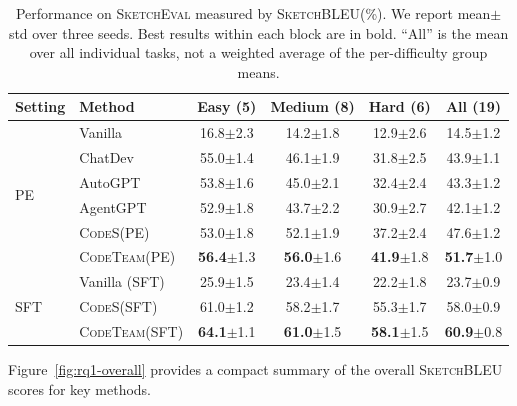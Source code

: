 \documentclass[format=acmsmall, review=false, screen=true]{acmart}
\newcommand{\tool}{\textsc{CodeTeam}\xspace}
\newcommand{\codes}{\textsc{CodeS}\xspace}
\newcommand{\sketcheval}{\textsc{SketchEval}\xspace}
\newcommand{\sketchbleu}{\textsc{SketchBLEU}\xspace}
\begin{document}
\begin{table}[t]
\centering
\small
\caption{Performance on \sketcheval measured by \sketchbleu (\%). We report mean$\pm$std over three seeds. Best results within each block are in bold. ``All'' is the mean over all individual tasks, not a weighted average of the per-difficulty group means.}
\label{tab:rq1-main}
\begin{tabular}{@{}llcccc@{}}
\toprule
Setting & Method & Easy (5) & Medium (8) & Hard (6) & All (19) \\
\midrule
\multirow{6}{*}{PE}
  & Vanilla & 16.8{\scriptsize$\pm$2.3} & 14.2{\scriptsize$\pm$1.8} & 12.9{\scriptsize$\pm$2.6} & 14.5{\scriptsize$\pm$1.2} \\
  & ChatDev & 55.0{\scriptsize$\pm$1.4} & 46.1{\scriptsize$\pm$1.9} & 31.8{\scriptsize$\pm$2.5} & 43.9{\scriptsize$\pm$1.1} \\
  & AutoGPT & 53.8{\scriptsize$\pm$1.6} & 45.0{\scriptsize$\pm$2.1} & 32.4{\scriptsize$\pm$2.4} & 43.3{\scriptsize$\pm$1.2} \\
  & AgentGPT & 52.9{\scriptsize$\pm$1.8} & 43.7{\scriptsize$\pm$2.2} & 30.9{\scriptsize$\pm$2.7} & 42.1{\scriptsize$\pm$1.2} \\
  & \codes (PE) & 53.0{\scriptsize$\pm$1.8} & 52.1{\scriptsize$\pm$1.9} & 37.2{\scriptsize$\pm$2.4} & 47.6{\scriptsize$\pm$1.2} \\
  & \tool (PE) & \textbf{56.4}{\scriptsize$\pm$1.3} & \textbf{56.0}{\scriptsize$\pm$1.6} & \textbf{41.9}{\scriptsize$\pm$1.8} & \textbf{51.7}{\scriptsize$\pm$1.0} \\
\midrule
\multirow{3}{*}{SFT}
  & Vanilla (SFT) & 25.9{\scriptsize$\pm$1.5} & 23.4{\scriptsize$\pm$1.4} & 22.2{\scriptsize$\pm$1.8} & 23.7{\scriptsize$\pm$0.9} \\
  & \codes (SFT) & 61.0{\scriptsize$\pm$1.2} & 58.2{\scriptsize$\pm$1.7} & 55.3{\scriptsize$\pm$1.7} & 58.0{\scriptsize$\pm$0.9} \\
  & \tool (SFT) & \textbf{64.1}{\scriptsize$\pm$1.1} & \textbf{61.0}{\scriptsize$\pm$1.5} & \textbf{58.1}{\scriptsize$\pm$1.5} & \textbf{60.9}{\scriptsize$\pm$0.8} \\
\bottomrule
\end{tabular}
\end{table}

Figure~\ref{fig:rq1-overall} provides a compact summary of the overall \sketchbleu scores for key methods.
\end{document}
